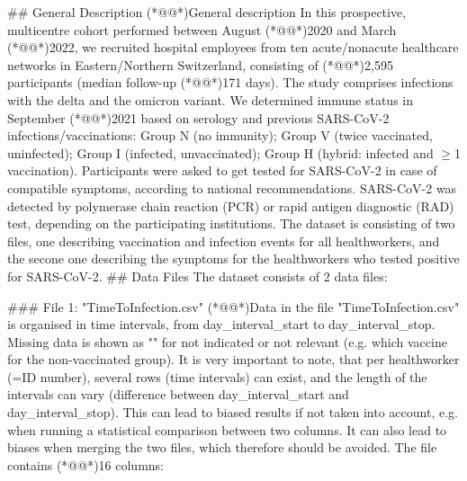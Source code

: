 \documentclass[11pt]{article}
\begin{document}
\begin{codeoutput}
\#\# General Description
(*@@*)General description 
In this prospective, multicentre cohort performed between August (*@@*)2020 and March (*@@*)2022, we recruited hospital employees from ten acute/nonacute healthcare networks in Eastern/Northern Switzerland, consisting of (*@@*)2,595 participants (median follow-up (*@@*)171 days). The study comprises infections with the delta and the omicron variant. We determined immune status in September (*@@*)2021 based on serology and previous SARS-CoV-2 infections/vaccinations: Group N (no immunity); Group V (twice vaccinated, uninfected); Group I (infected, unvaccinated); Group H (hybrid: infected and $\geq$1 vaccination). Participants were asked to get tested for SARS-CoV-2 in case of compatible symptoms, according to national recommendations. SARS-CoV-2 was detected by polymerase chain reaction (PCR) or rapid antigen diagnostic (RAD) test, depending on the participating institutions. The dataset is consisting of two files, one describing vaccination and infection events for all healthworkers, and the secone one describing the symptoms for the healthworkers who tested positive for SARS-CoV-2.
\#\# Data Files
The dataset consists of 2 data files:

\#\#\# File 1: "TimeToInfection.csv"
(*@@*)Data in the file "TimeToInfection.csv" is organised in time intervals, from day\_interval\_start to day\_interval\_stop. Missing data is shown as "" for not indicated or not relevant (e.g. which vaccine for the non-vaccinated group). It is very important to note, that per healthworker (=ID number), several rows (time intervals) can exist, and the length of the intervals can vary (difference between day\_interval\_start and day\_interval\_stop). This can lead to biased results if not taken into account, e.g. when running a statistical comparison between two columns. It can also lead to biases when merging the two files, which therefore should be avoided. The file contains (*@@*)16 columns:


\end{codeoutput}
\end{document}
